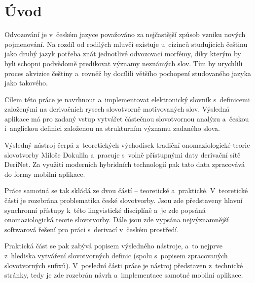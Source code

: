 \hypertarget{uxfavod}{%
\chapter*{Úvod}\label{uvod}
}

Odvozování je v~českém jazyce považováno za nejčastější způsob vzniku
nových pojmenování. Na rozdíl od rodilých mluvčí existuje u~cizinců
studujících češtinu jako druhý jazyk potřeba znát jednotlivé odvozovací
morfémy, díky kterým by byli schopni podvědomě predikovat významy
neznámých slov. Tím by urychlili proces akvizice češtiny a~rovněž by
docílili většího pochopení studovaného jazyka jako takového.

Cílem této práce je navrhnout a~implementovat elektronický slovník
s~definicemi založenými na derivačních rysech slovotvorně motivovaných
slov. Výsledná aplikace má pro zadaný vstup vytvářet částečnou
slovotvornou analýzu a~českou i~anglickou definici založenou na
strukturním významu zadaného slova.

Výsledný nástroj čerpá z~teoretických východisek tradiční
onomaziologické teorie slovotvorby Miloše Dokulila a~pracuje s~volně
přístupnými daty derivační sítě DeriNet. Za využití moderních hybridních
technologií pak tato data zpracovává do formy mobilní aplikace.

Práce samotná se tak skládá ze dvou částí -- teoretické a~praktické.
V~teoretické části je rozebrána problematika české slovotvorby. Jsou zde
představeny hlavní synchronní přístupy k~této lingvistické disciplíně
a~je zde popsáná onomaziologická teorie slovotvorby. Dále jsou zde vypsána
nejvýznamnější softwarová řešení pro práci s~derivací v~českém
prostředí.

Praktická část se pak zabývá popisem výsledného nástroje, a~to nejprve
z~hlediska vytváření slovotvorných definic (spolu s~popisem zpracovaných
slovotvorných sufixů). V~poslední části práce je nástroj představen
z~technické stránky, tedy je zde rozebrán návrh a~implementace samotné
mobilní aplikace.
